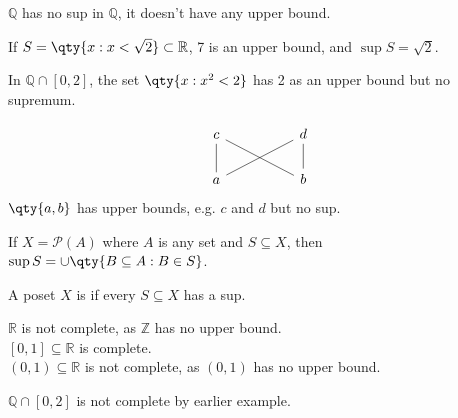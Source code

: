 \begin{example}
    $\mathbb{Q}$ has no sup in $\mathbb{Q}$, it doesn't have any upper bound.
\end{example}

\begin{example}
    If $S = \qty{x : x < \sqrt{2}} \subset \mathbb R$, 7 is an upper bound, and $\sup S = \sqrt{2}$.

    In $\mathbb Q \cap [0, 2]$, the set $\qty{x : x^2 < 2}$ has 2 as an upper bound but no supremum.
\end{example}

\begin{example}
    \[\begin{tikzcd}
        c && d \\
        a && b
        \arrow[no head, from=2-1, to=1-1]
        \arrow[no head, from=2-3, to=1-3]
        \arrow[no head, from=2-1, to=1-3]
        \arrow[no head, from=2-3, to=1-1]
    \end{tikzcd}\]
    $\qty{a, b}$ has upper bounds, e.g. $c$ and $d$ but no sup.
\end{example}

\begin{example}
    If $X = \mathcal{P}(A)$ where $A$ is any set and $S \subseteq X$, then $\sup S = \cup \qty{B \subseteq A : B \in S}$.
\end{example}

\begin{definition}[Complete]
    A poset $X$ is  if every $S \subseteq X$ has a sup.
\end{definition}

\begin{example}
    $\mathbb R$ is not complete, as $\mathbb Z$ has no upper bound. \\
    $[0,1] \subseteq \mathbb R$ is complete. \\
    $(0,1) \subseteq \mathbb R$ is not complete, as $(0,1)$ has no upper bound.
\end{example}

\begin{example}
    $\mathbb{Q} \cap [0, 2]$ is not complete by earlier example.
\end{example}

